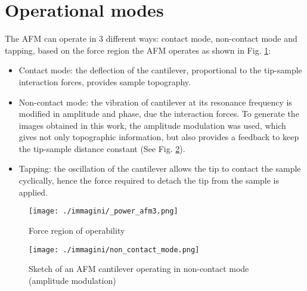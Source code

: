\section{Operational modes}

The AFM can operate in 3 different ways: contact mode, non-contact mode and tapping, based on the force region the AFM operates as shown in Fig. \ref{fig:AFM_modes_a}:
\begin{itemize}
    \item Contact mode: the deflection of the cantilever, proportional to the tip-sample
    interaction forces, provides sample topography.
    \item Non-contact mode: the vibration of cantilever at its resonance frequency is modified in amplitude and phase, due the interaction forces. To generate the images obtained in this work, the amplitude modulation was used, which gives not only topographic information, but also provides a feedback to keep the tip-sample distance constant (See Fig. \ref{fig:AFM_modes_b}).
    \item Tapping: the oscillation of the cantilever allows the tip to contact the sample cyclically, hence the force required to detach the tip from the sample is applied.
\end{itemize}

\newpage

\begin{figure}[h]
    \centering
    \texttt{[image: ./immagini/\_power\_afm3.png]}
    \caption{Force region of operability}
    \label{fig:AFM_modes_a}
\end{figure}

\begin{figure}[h]
    \centering
    \texttt{[image: ./immagini/non\_contact\_mode.png]}
    \caption{Sketch of an AFM cantilever operating in non-contact mode (amplitude modulation) \cite{immagine_luigi}}
    \label{fig:AFM_modes_b}
\end{figure}


